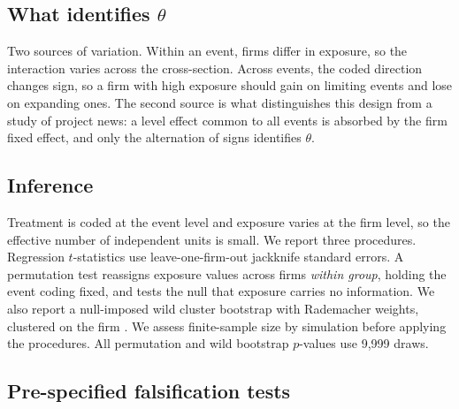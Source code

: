 \documentclass[11pt]{article}
\theoremstyle{plain}\newtheorem{proposition}{Proposition}
\begin{document}
\subsection{What identifies $\theta$}

Two sources of variation. Within an event, firms differ in exposure, so the interaction varies across the cross-section. Across events, the coded direction changes sign, so a firm with high exposure should gain on limiting events and lose on expanding ones. The second source is what distinguishes this design from a study of project news: a level effect common to all events is absorbed by the firm fixed effect, and only the alternation of signs identifies $\theta$.

\subsection{Inference}

Treatment is coded at the event level and exposure varies at the firm level, so the effective number of independent units is small. We report three procedures. Regression $t$-statistics use leave-one-firm-out jackknife standard errors. A permutation test reassigns exposure values across firms \emph{within group}, holding the event coding fixed, and tests the null that exposure carries no information. We also report a null-imposed wild cluster bootstrap with Rademacher weights, clustered on the firm \citep{cameron2008}. We assess finite-sample size by simulation before applying the procedures. All permutation and wild bootstrap $p$-values use 9,999 draws.

\subsection{Pre-specified falsification tests}
\end{document}
